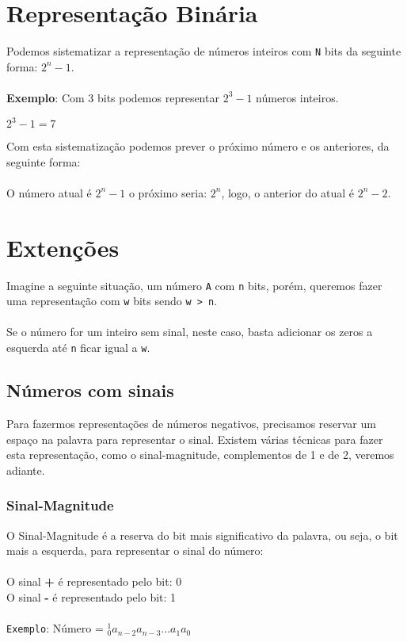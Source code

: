 \documentclass[12pt, onecolumn]{article}
\begin{document}
	\section{Representação Binária}
	Podemos sistematizar a representação de números inteiros com \texttt{N} bits
	da seguinte forma: $2^{n} - 1$. \\
	\\
	\textbf{Exemplo}: Com 3 bits podemos representar $2^{3} - 1$ números inteiros.
			\begin{center} 
				$2^{3} - 1 = 7$ \\
			\end{center}
	Com esta sistematização podemos prever o próximo número e os anteriores, 
	da seguinte forma: \\
	\\
	O número atual é $2^{n} - 1$ o próximo seria: $2^{n}$, logo, o anterior
	do atual é $2^{n} - 2$.

	\section{Extenções}
	Imagine a seguinte situação, um número \texttt{A} com \texttt{n} bits, porém,
	queremos fazer uma representação com \texttt{w} bits sendo \texttt{w > n}.\\
	\\
	Se o número for um inteiro sem sinal, neste caso, basta adicionar os zeros
	a esquerda até \texttt{n} ficar igual a \texttt{w}.
	
	\subsection{Números com sinais}
	Para fazermos representações de números negativos, precisamos reservar um espaço
	na palavra para representar o sinal. Existem várias técnicas para fazer esta 
	representação, como o sinal-magnitude, complementos de 1 e de 2, veremos
	adiante.

	\subsubsection{Sinal-Magnitude}
	O Sinal-Magnitude é a reserva do bit mais significativo da palavra, ou seja, 
	o bit mais a esquerda, para representar o sinal do número: \\
	\\
	O sinal \textbf{+} é representado pelo bit: 0\\
	O sinal \textbf{-} é representado pelo bit: 1\\
	\\
	\texttt{Exemplo}: Número = ${_0^1} a_{n-2} a_{n-3} ... a_1 a_0 $
	




	
        
\end{document}
